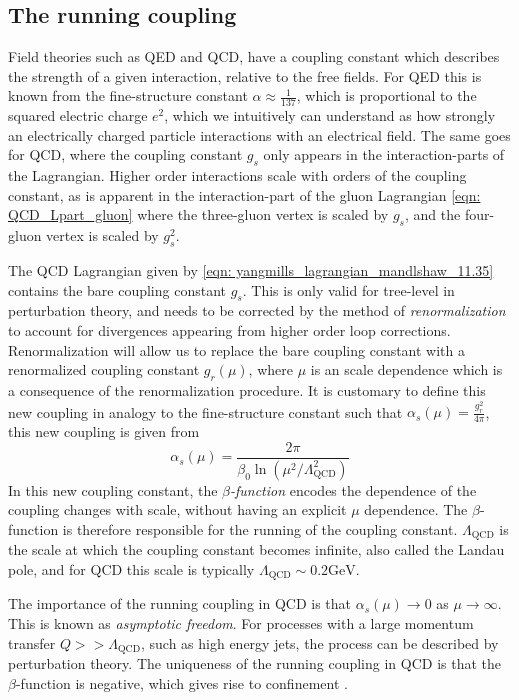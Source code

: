 \documentclass[main.tex]{subfiles}
\begin{document}
\subsection{The running coupling}
Field theories such as QED and QCD, have a coupling constant which describes the strength of a given interaction, relative to the free fields. For QED this is known from the fine-structure constant \(\alpha \approx \frac{1}{137}\), which is proportional to the squared electric charge \(e^2\), which we intuitively can understand as how strongly an electrically charged particle interactions with an electrical field. The same goes for QCD, where the coupling constant \(g_s\) only appears in the interaction-parts of the Lagrangian. Higher order interactions scale with orders of the coupling constant, as is apparent in the interaction-part of the gluon Lagrangian \autoref{eqn: QCD_Lpart_gluon} where the three-gluon vertex is scaled by \(g_s\), and the four-gluon vertex is scaled by \(g_s^2\). 

The QCD Lagrangian given by \autoref{eqn: yangmills_lagrangian_mandlshaw_11.35} contains the bare coupling constant \(g_s\). This is only valid for tree-level in perturbation theory, and needs to be corrected by the method of \emph{renormalization} to account for divergences appearing from higher order loop corrections. Renormalization will allow us to replace the bare coupling constant with a renormalized coupling constant \(g_r(\mu)\), where \(\mu\) is an scale dependence which is a consequence of the renormalization procedure. It is customary to define this new coupling in analogy to the fine-structure constant such that \(\alpha_s(\mu)=\frac{g_r^2}{4\pi}\), this new coupling is given from 
\begin{equation}\label{eqn: coupling_QCD_running}
    \alpha_s(\mu) = \frac{2\pi}{\beta_0 \ln(\mu^2/\Lambda_{\text{QCD}}^2)}
\end{equation}
In this new coupling constant, the \emph{\(\beta\)-function} encodes the dependence of the coupling changes with scale, without having an explicit \(\mu\) dependence. The \(\beta\)-function is therefore responsible for the running of the coupling constant. \(\Lambda_{\text{QCD}}\) is the scale at which the coupling constant becomes infinite, also called the Landau pole, and for QCD this scale is typically \(\Lambda_{\text{QCD}} \sim 0.2 \text{GeV}\). 


The importance of the running coupling in QCD is that \(\alpha_s(\mu)\rightarrow 0\) as \(\mu\rightarrow \infty\). This is known as \textit{asymptotic freedom}. For processes with a large momentum transfer \(Q>>\Lambda_{\text{QCD}}\), such as high energy jets, the process can be described by perturbation theory. The uniqueness of the running coupling in QCD is that the \(\beta\)-function is negative, which gives rise to confinement \cite{Caucal:2020zcz}.
\end{document}
